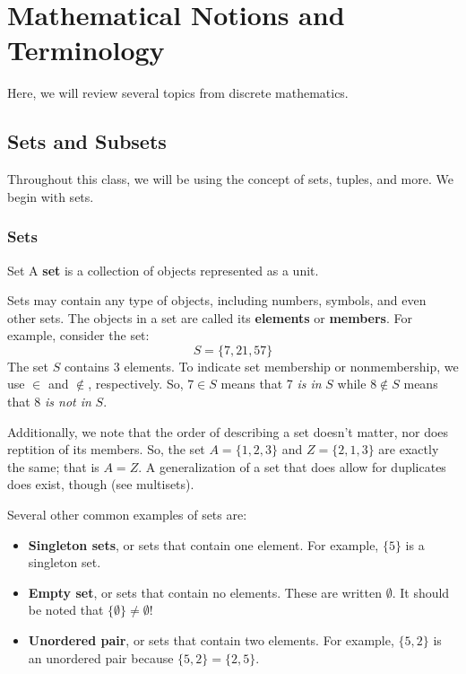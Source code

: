 \documentclass[letterpaper]{article}
\begin{document}
\section{Mathematical Notions and Terminology}
Here, we will review several topics from discrete mathematics. 

\subsection{Sets and Subsets}
Throughout this class, we will be using the concept of sets, tuples, and more. We begin with sets. 

\subsubsection{Sets}
\begin{definition}{Set}{}
    A \textbf{set} is a collection of objects represented as a unit.
\end{definition}
Sets may contain any type of objects, including numbers, symbols, and even other sets. The objects in a set are called its \textbf{elements} or \textbf{members}. For example, consider the set:
\[S = \{7, 21, 57\}\]
The set $S$ contains 3 elements. To indicate set membership or nonmembership, we use $\in$ and $\notin$, respectively. So, $7 \in S$ means that 7 \emph{is in} $S$ while $8 \notin S$ means that 8 \emph{is not in} $S$. 

\bigskip 

Additionally, we note that the order of describing a set doesn't matter, nor does reptition of its members. So, the set $A = \{1, 2, 3\}$ and $Z = \{2, 1, 3\}$ are exactly the same; that is $A = Z$. A generalization of a set that does allow for duplicates does exist, though (see multisets).  

\bigskip

Several other common examples of sets are:
\begin{itemize}
    \item \textbf{Singleton sets}, or sets that contain one element. For example, $\{5\}$ is a singleton set. 
    \item \textbf{Empty set}, or sets that contain no elements. These are written $\emptyset$. It should be noted that $\{\emptyset\} \neq \emptyset$!
    \item \textbf{Unordered pair}, or sets that contain two elements. For example, $\{5, 2\}$ is an unordered pair because $\{5, 2\} = \{2, 5\}$. 
\end{itemize}
\end{document}
